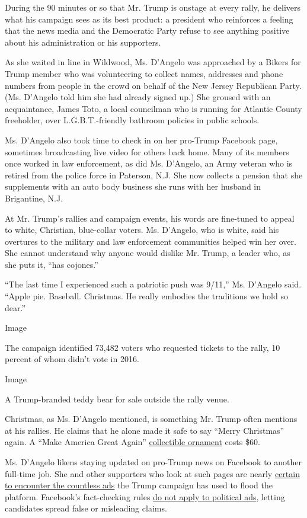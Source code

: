 During the 90 minutes or so that Mr. Trump is onstage at every rally, he
delivers what his campaign sees as its best product: a president who
reinforces a feeling that the news media and the Democratic Party refuse
to see anything positive about his administration or his supporters.

As she waited in line in Wildwood, Ms. D'Angelo was approached by a
Bikers for Trump member who was volunteering to collect names, addresses
and phone numbers from people in the crowd on behalf of the New Jersey
Republican Party. (Ms. D'Angelo told him she had already signed up.) She
groused with an acquaintance, James Toto, a local councilman who is
running for Atlantic County freeholder, over L.G.B.T.-friendly bathroom
policies in public schools.

Ms. D'Angelo also took time to check in on her pro-Trump Facebook page,
sometimes broadcasting live video for others back home. Many of its
members once worked in law enforcement, as did Ms. D'Angelo, an Army
veteran who is retired from the police force in Paterson, N.J. She now
collects a pension that she supplements with an auto body business she
runs with her husband in Brigantine, N.J.

At Mr. Trump's rallies and campaign events, his words are fine-tuned to
appeal to white, Christian, blue-collar voters. Ms. D'Angelo, who is
white, said his overtures to the military and law enforcement
communities helped win her over. She cannot understand why anyone would
dislike Mr. Trump, a leader who, as she puts it, ``has cojones.''

``The last time I experienced such a patriotic push was 9/11,'' Ms.
D'Angelo said. ``Apple pie. Baseball. Christmas. He really embodies the
traditions we hold so dear.''

Image

The campaign identified 73,482 voters who requested tickets to the
rally, 10 percent of whom didn't vote in 2016.

Image

A Trump-branded teddy bear for sale outside the rally venue.

Christmas, as Ms. D'Angelo mentioned, is something Mr. Trump often
mentions at his rallies. He claims that he alone made it safe to say
``Merry Christmas'' again. A ``Make America Great Again''
\href{https://shop.donaldjtrump.com/products/keep-america-great-collectible-ornament}{collectible
ornament} costs \$60.

Ms. D'Angelo likens staying updated on pro-Trump news on Facebook to
another full-time job. She and other supporters who look at such pages
are nearly
\href{https://www.nytimes3xbfgragh.onion/2019/10/20/us/elections/trump-campaign-ads-democrats.html}{certain
to encounter the countless ads} the Trump campaign has used to flood the
platform. Facebook's fact-checking rules
\href{https://www.nytimes3xbfgragh.onion/2019/10/08/technology/facebook-trump-biden-ad.html}{do
not apply to political ads}, letting candidates spread false or
misleading claims.

